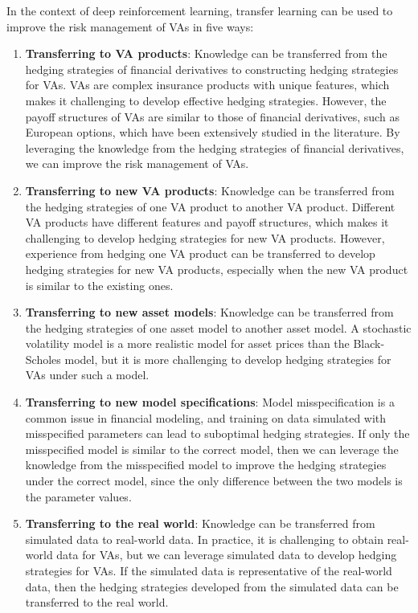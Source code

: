 In the context of deep reinforcement learning, transfer learning can be used to improve the risk management of VAs in five ways:
\begin{enumerate}
    \item   \textbf{Transferring to VA products}: Knowledge can be transferred from the hedging strategies of financial derivatives to constructing hedging strategies for VAs.
    VAs are complex insurance products with unique features, which makes it challenging to develop effective hedging strategies.
    However, the payoff structures of VAs are similar to those of financial derivatives, such as European options, which have been extensively studied in the literature.
    By leveraging the knowledge from the hedging strategies of financial derivatives, we can improve the risk management of VAs.
    \item   \textbf{Transferring to new VA products}: Knowledge can be transferred from the hedging strategies of one VA product to another VA product.
    Different VA products have different features and payoff structures, which makes it challenging to develop hedging strategies for new VA products.
    However, experience from hedging one VA product can be transferred to develop hedging strategies for new VA products, especially when the new VA product is similar to the existing ones.
    \item   \textbf{Transferring to new asset models}: Knowledge can be transferred from the hedging strategies of one asset model to another asset model.
    A stochastic volatility model is a more realistic model for asset prices than the Black-Scholes model, but it is more challenging to develop hedging strategies for VAs under such a model.
    \item  \textbf{Transferring to new model specifications}: Model misspecification is a common issue in financial modeling, and training on data simulated with misspecified parameters can lead to suboptimal hedging strategies.
    If only the misspecified model is similar to the correct model, then we can leverage the knowledge from the misspecified model to improve the hedging strategies under the correct model, since the only difference between the two models is the parameter values. 
    \item   \textbf{Transferring to the real world}: Knowledge can be transferred from simulated data to real-world data.
    In practice, it is challenging to obtain real-world data for VAs, but we can leverage simulated data to develop hedging strategies for VAs.
    If the simulated data is representative of the real-world data, then the hedging strategies developed from the simulated data can be transferred to the real world.
\end{enumerate}
